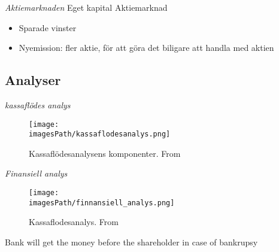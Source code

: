 \textit{Aktiemarknaden} \newline
Eget kapital Aktiemarknad
\begin{itemize}
    \item Sparade vinster 
    \item Nyemission: fler aktie, för att göra det biligare att handla med aktien
\end{itemize}

\subsection{Analyser}
\textit{kassaflödes analys}
\begin{figure}[H]
    \centering
    \texttt{[image: \\imagesPath/kassaflodesanalys.png]}
    \caption{Kassaflödesanalysens komponenter. From \cite{im}}
\end{figure}

\textit{Finansiell analys}
\begin{figure}[H]
    \centering
    \texttt{[image: \\imagesPath/finnansiell\_analys.png]}
    \caption{Kassaflodesanalys. From \cite{im}}
\end{figure}

Bank will get the money before the shareholder in case of bankrupsy
